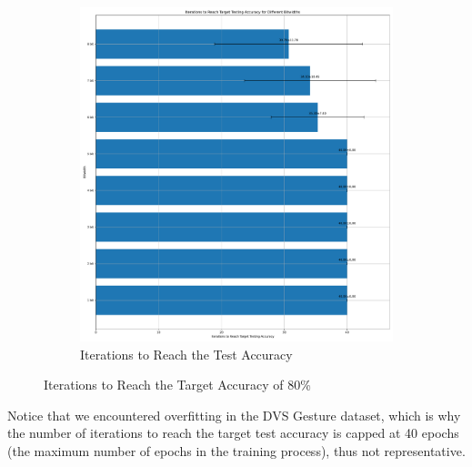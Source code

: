 \begin{figure}[H]
\begin{subfigure}[H]{0.48\textwidth}
                \includegraphics[width=\textwidth]{../standard/DVSGesture/plots/dvsgesture_test_iters.pdf}
                \caption{Iterations to Reach the Test Accuracy}
            \end{subfigure}
            \caption{Iterations to Reach the Target Accuracy of 80\%}
        \end{figure}

    Notice that we encountered overfitting in the DVS Gesture dataset, which is why the number of iterations to reach the target test accuracy is capped at 40 epochs (the maximum number of epochs in the training process), thus not representative. 

